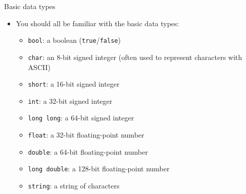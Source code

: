 \documentclass[10pt]{beamer}
\newcommand{\bi}{\begin{itemize}}
\newcommand{\ei}{\end{itemize}}
\begin{document}
\begin{frame}{Basic data types}
    \bi
        \vspace{20pt}

        \item You should all be familiar with the basic data types:

        \bi
            \item \texttt{bool}: a boolean (\texttt{true}/\texttt{false})
            \vspace{5pt}
            \item \texttt{char}: an 8-bit signed integer (often used to represent characters with ASCII)
            \item \texttt{short}: a 16-bit signed integer
            \item \texttt{int}: a 32-bit signed integer
            \item \texttt{long long}: a 64-bit signed integer
            \vspace{5pt}
            \item \texttt{float}: a 32-bit floating-point number
            \item \texttt{double}: a 64-bit floating-point number
            \item \texttt{long double}: a 128-bit floating-point number
            \vspace{10pt}
            \item \texttt{string}: a string of characters
        \ei
    \ei
\end{frame}
\end{document}
